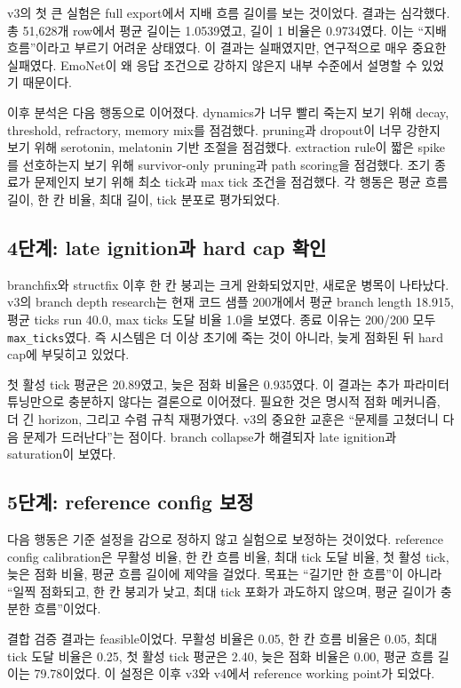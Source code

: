 \documentclass[11pt,a4paper]{article}
\newcommand{\eng}[1]{\texttt{#1}}
\begin{document}
v3의 첫 큰 실험은 full export에서 지배 흐름 길이를 보는 것이었다. 결과는 심각했다. 총 51,628개 row에서 평균 길이는 1.0539였고, 길이 1 비율은 0.9734였다. 이는 ``지배 흐름''이라고 부르기 어려운 상태였다. 이 결과는 실패였지만, 연구적으로 매우 중요한 실패였다. EmoNet이 왜 응답 조건으로 강하지 않은지 내부 수준에서 설명할 수 있었기 때문이다.

이후 분석은 다음 행동으로 이어졌다. dynamics가 너무 빨리 죽는지 보기 위해 decay, threshold, refractory, memory mix를 점검했다. pruning과 dropout이 너무 강한지 보기 위해 serotonin, melatonin 기반 조절을 점검했다. extraction rule이 짧은 spike를 선호하는지 보기 위해 survivor-only pruning과 path scoring을 점검했다. 조기 종료가 문제인지 보기 위해 최소 tick과 max tick 조건을 점검했다. 각 행동은 평균 흐름 길이, 한 칸 비율, 최대 길이, tick 분포로 평가되었다.

\subsection{4단계: late ignition과 hard cap 확인}

branchfix와 structfix 이후 한 칸 붕괴는 크게 완화되었지만, 새로운 병목이 나타났다. v3의 branch depth research는 현재 코드 샘플 200개에서 평균 branch length 18.915, 평균 ticks run 40.0, max ticks 도달 비율 1.0을 보였다. 종료 이유는 200/200 모두 \eng{max\_ticks}였다. 즉 시스템은 더 이상 초기에 죽는 것이 아니라, 늦게 점화된 뒤 hard cap에 부딪히고 있었다.

첫 활성 tick 평균은 20.89였고, 늦은 점화 비율은 0.935였다. 이 결과는 추가 파라미터 튜닝만으로 충분하지 않다는 결론으로 이어졌다. 필요한 것은 명시적 점화 메커니즘, 더 긴 horizon, 그리고 수렴 규칙 재평가였다. v3의 중요한 교훈은 ``문제를 고쳤더니 다음 문제가 드러난다''는 점이다. branch collapse가 해결되자 late ignition과 saturation이 보였다.

\subsection{5단계: reference config 보정}

다음 행동은 기준 설정을 감으로 정하지 않고 실험으로 보정하는 것이었다. reference config calibration은 무활성 비율, 한 칸 흐름 비율, 최대 tick 도달 비율, 첫 활성 tick, 늦은 점화 비율, 평균 흐름 길이에 제약을 걸었다. 목표는 ``길기만 한 흐름''이 아니라 ``일찍 점화되고, 한 칸 붕괴가 낮고, 최대 tick 포화가 과도하지 않으며, 평균 길이가 충분한 흐름''이었다.

결합 검증 결과는 feasible이었다. 무활성 비율은 0.05, 한 칸 흐름 비율은 0.05, 최대 tick 도달 비율은 0.25, 첫 활성 tick 평균은 2.40, 늦은 점화 비율은 0.00, 평균 흐름 길이는 79.78이었다. 이 설정은 이후 v3와 v4에서 reference working point가 되었다.
\end{document}
